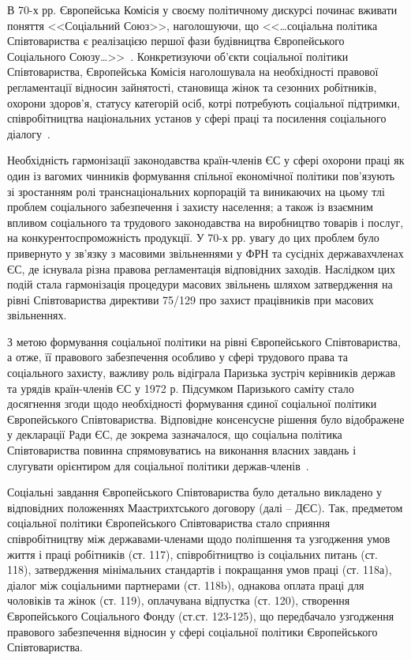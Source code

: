 В 70-х рр. Європейська Комісія у своєму політичному дискурсі починає вживати поняття <<Соціальний Союз>>, наголошуючи, що <<…соціальна політика Співтовариства є реалізацією першої фази будівництва Європейського Соціального Союзу…>>~\cite{EuCouncil}. 
Конкретизуючи об’єкти соціальної політики Співтовариства, Європейська Комісія наголошувала на необхідності правової регламентації відносин зайнятості, становища жінок та сезонних робітників, охорони здоров’я, статусу категорій осіб, котрі потребують соціальної підтримки, співробітництва національних установ у сфері праці та посилення соціального діалогу~\cite{Shashula2015}. 

Необхідність гармонізації законодавства країн-членів ЄС у сфері охорони праці як один із вагомих чинників формування спільної економічної політики пов’язують зі зростанням ролі транснаціональних корпорацій та виникаючих на цьому тлі проблем соціального забезпечення і захисту населення; а також із взаємним впливом соціального та трудового законодавства на виробництво товарів і послуг, на конкурентоспроможність продукції. 
У 70-х рр. увагу до цих проблем було привернуто у зв’язку з масовими звільненнями у ФРН та сусідніх державахчленах ЄС, де існувала різна правова регламентація відповідних заходів.
Наслідком цих подій стала гармонізація процедури масових звільнень шляхом затвердження на рівні Співтовариства директиви 75/129 про захист працівників при масових звільненнях.

З метою формування соціальної політики на рівні Європейського Співтовариства, а отже, її правового забезпечення особливо у сфері трудового права та соціального захисту, важливу роль відіграла Паризька зустріч керівників держав та урядів країн-членів ЄС у 1972 р. 
Підсумком Паризького саміту стало досягнення згоди щодо необхідності формування єдиної соціальної політики Європейського Співтовариства. Відповідне консенсусне рішення було відображене у декларації Ради ЄС, де зокрема зазначалося, що соціальна політика Співтовариства повинна спрямовуватись на виконання власних завдань і слугувати орієнтиром для соціальної політики держав-членів~\cite{Shashula2015}. 

Соціальні завдання Європейського Співтовариства було детально викладено у відповідних положеннях Маастрихтського договору (далі – ДЄС). 
Так, предметом соціальної політики Європейського Співтовариства стало сприяння співробітництву між державами-членами щодо поліпшення та узгодження умов життя і праці робітників (ст. 117), співробітництво із соціальних питань (ст. 118), затвердження мінімальних стандартів і покращання умов праці (ст. 118а), діалог між соціальними партнерами (ст. 118b), однакова оплата праці для чоловіків та жінок (ст. 119), оплачувана відпустка (ст. 120), створення Європейського Соціального Фонду (ст.ст. 123-125), що передбачало узгодження правового забезпечення відносин у сфері соціальної політики Європейського Співтовариства.

